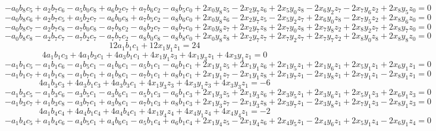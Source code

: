 \[ - a_{0} b_{8} c_{5} + a_{2} b_{7} c_{6} - a_{5} b_{0} c_{8} + a_{6} b_{2} c_{7} + a_{7} b_{6} c_{2} - a_{8} b_{5} c_{0} + 2 x_{0} y_{8} z_{5} - 2 x_{2} y_{7} z_{6} + 2 x_{5} y_{0} z_{8} - 2 x_{6} y_{2} z_{7} - 2 x_{7} y_{6} z_{2} + 2 x_{8} y_{5} z_{0} = 0 \]
\[ - a_{0} b_{8} c_{6} + a_{2} b_{7} c_{5} + a_{5} b_{2} c_{7} - a_{6} b_{0} c_{8} + a_{7} b_{5} c_{2} - a_{8} b_{6} c_{0} + 2 x_{0} y_{8} z_{6} - 2 x_{2} y_{7} z_{5} - 2 x_{5} y_{2} z_{7} + 2 x_{6} y_{0} z_{8} - 2 x_{7} y_{5} z_{2} + 2 x_{8} y_{6} z_{0} = 0 \]
\[ - a_{0} b_{8} c_{7} - a_{2} b_{7} c_{8} - a_{7} b_{0} c_{8} - a_{7} b_{8} c_{2} - a_{8} b_{2} c_{7} - a_{8} b_{7} c_{0} + 2 x_{0} y_{8} z_{7} + 2 x_{2} y_{7} z_{8} + 2 x_{7} y_{0} z_{8} + 2 x_{7} y_{8} z_{2} + 2 x_{8} y_{2} z_{7} + 2 x_{8} y_{7} z_{0} = 0 \]
\[ - a_{0} b_{8} c_{8} - a_{2} b_{7} c_{7} - a_{7} b_{2} c_{7} - a_{7} b_{7} c_{2} - a_{8} b_{0} c_{8} - a_{8} b_{8} c_{0} + 2 x_{0} y_{8} z_{8} + 2 x_{2} y_{7} z_{7} + 2 x_{7} y_{2} z_{7} + 2 x_{7} y_{7} z_{2} + 2 x_{8} y_{0} z_{8} + 2 x_{8} y_{8} z_{0} = 0 \]
\[ 12 a_{1} b_{1} c_{1} + 12 x_{1} y_{1} z_{1} = 24 \]
\[ 4 a_{1} b_{1} c_{3} + 4 a_{1} b_{3} c_{1} + 4 a_{3} b_{1} c_{1} + 4 x_{1} y_{1} z_{3} + 4 x_{1} y_{3} z_{1} + 4 x_{3} y_{1} z_{1} = 0 \]
\[ - a_{1} b_{1} c_{5} - a_{1} b_{1} c_{6} - a_{1} b_{5} c_{1} - a_{1} b_{6} c_{1} - a_{5} b_{1} c_{1} - a_{6} b_{1} c_{1} + 2 x_{1} y_{1} z_{5} + 2 x_{1} y_{1} z_{6} + 2 x_{1} y_{5} z_{1} + 2 x_{1} y_{6} z_{1} + 2 x_{5} y_{1} z_{1} + 2 x_{6} y_{1} z_{1} = 0 \]
\[ - a_{1} b_{1} c_{7} + a_{1} b_{1} c_{8} - a_{1} b_{7} c_{1} + a_{1} b_{8} c_{1} - a_{7} b_{1} c_{1} + a_{8} b_{1} c_{1} + 2 x_{1} y_{1} z_{7} - 2 x_{1} y_{1} z_{8} + 2 x_{1} y_{7} z_{1} - 2 x_{1} y_{8} z_{1} + 2 x_{7} y_{1} z_{1} - 2 x_{8} y_{1} z_{1} = 0 \]
\[ 4 a_{1} b_{3} c_{3} + 4 a_{3} b_{1} c_{3} + 4 a_{3} b_{3} c_{1} + 4 x_{1} y_{3} z_{3} + 4 x_{3} y_{1} z_{3} + 4 x_{3} y_{3} z_{1} = -6 \]
\[ - a_{1} b_{3} c_{5} - a_{1} b_{3} c_{6} - a_{3} b_{5} c_{1} - a_{3} b_{6} c_{1} - a_{5} b_{1} c_{3} - a_{6} b_{1} c_{3} + 2 x_{1} y_{3} z_{5} + 2 x_{1} y_{3} z_{6} + 2 x_{3} y_{5} z_{1} + 2 x_{3} y_{6} z_{1} + 2 x_{5} y_{1} z_{3} + 2 x_{6} y_{1} z_{3} = 0 \]
\[ - a_{1} b_{3} c_{7} + a_{1} b_{3} c_{8} - a_{3} b_{7} c_{1} + a_{3} b_{8} c_{1} - a_{7} b_{1} c_{3} + a_{8} b_{1} c_{3} + 2 x_{1} y_{3} z_{7} - 2 x_{1} y_{3} z_{8} + 2 x_{3} y_{7} z_{1} - 2 x_{3} y_{8} z_{1} + 2 x_{7} y_{1} z_{3} - 2 x_{8} y_{1} z_{3} = 0 \]
\[ 4 a_{1} b_{4} c_{4} + 4 a_{4} b_{1} c_{4} + 4 a_{4} b_{4} c_{1} + 4 x_{1} y_{4} z_{4} + 4 x_{4} y_{1} z_{4} + 4 x_{4} y_{4} z_{1} = -2 \]
\[ - a_{1} b_{4} c_{5} + a_{1} b_{4} c_{6} - a_{4} b_{5} c_{1} + a_{4} b_{6} c_{1} - a_{5} b_{1} c_{4} + a_{6} b_{1} c_{4} + 2 x_{1} y_{4} z_{5} - 2 x_{1} y_{4} z_{6} + 2 x_{4} y_{5} z_{1} - 2 x_{4} y_{6} z_{1} + 2 x_{5} y_{1} z_{4} - 2 x_{6} y_{1} z_{4} = 0 \]

